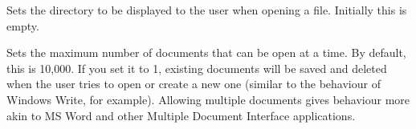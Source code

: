 
\label{wxdocmanagersetlastdirectory}


Sets the directory to be displayed to the user when opening a file. Initially this is empty.

\label{wxdocmanagersetmaxdocsopen}


Sets the maximum number of documents that can be open at a time. By default, this
is 10,000. If you set it to 1, existing documents will be saved and deleted
when the user tries to open or create a new one (similar to the behaviour
of Windows Write, for example). Allowing multiple documents gives behaviour
more akin to MS Word and other Multiple Document Interface applications.



